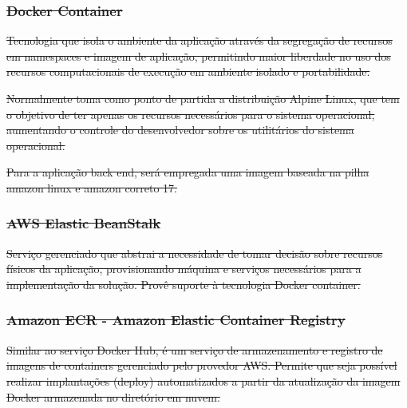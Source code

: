 \documentclass[
    12pt,               %
    openright,          %
    oneside,
    a4paper,            %
    BIBLATEX,           %
    TODO,               %
    english,            %
    brazil              %
    ]{ifsp-spo-inf-ctds}
\providecommand{\DIFdel}[1]{{\protect\color{red}\sout{#1}}}                      %
\begin{document}

\subsubsection{\DIFdel{Docker Container}}
\addtocounter{subsubsection}{-1}%

\DIFdel{Tecnologia que isola o ambiente da aplicação através da segregação de recursos em namespaces e imagem de aplicação, permitindo maior liberdade no uso dos recursos computacionais de execução em ambiente isolado e portabilidade.
            }%

\DIFdel{Normalmente toma como ponto de partida a distribuição Alpine Linux, que tem o objetivo de ter apenas os recursos necessários para o sistema operacional, aumentando o controle do desenvolvedor sobre os utilitários do sistema operacional.
    }%

\DIFdel{Para a aplicação back end, será empregada uma imagem baseada na pilha amazon linux e amazon correto 17.
            }%

\subsubsection{\DIFdel{AWS Elastic BeanStalk}}
\addtocounter{subsubsection}{-1}%

\DIFdel{Serviço gerenciado que abstrai a necessidade de tomar decisão sobre recursos físicos da aplicação, provisionando máquina e serviços necessários para a implementação da solução. Provê suporte à tecnologia Docker container.
            }%

\subsubsection{\DIFdel{Amazon ECR - Amazon Elastic Container Registry}}
\addtocounter{subsubsection}{-1}%

\DIFdel{Similar ao serviço Docker Hub, é um serviço de armazenamento e registro de imagens de containers gerenciado pelo provedor AWS. Permite que seja possível realizar implantações (deploy) automatizados a partir da atualização da imagem Docker armazenada no diretório em nuvem.
}%
\end{document}
